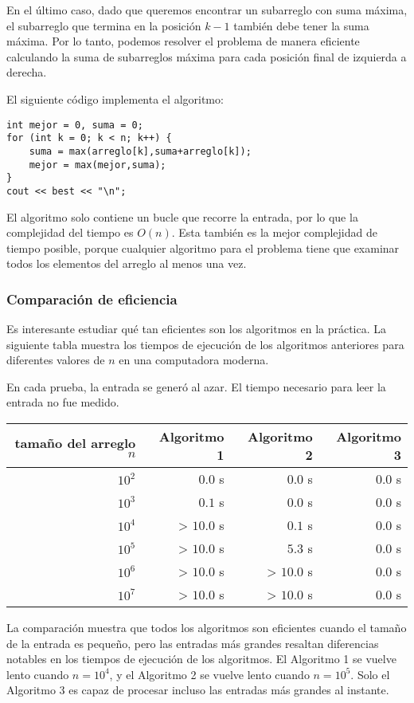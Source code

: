 En el último caso, dado que queremos
encontrar un subarreglo con suma máxima,
el subarreglo que termina en la posición $k-1$
también debe tener la suma máxima.
Por lo tanto, podemos resolver el problema de manera eficiente
calculando la suma de subarreglos máxima
para cada posición final de izquierda a derecha.

El siguiente código implementa el algoritmo:
\begin{lstlisting}
int mejor = 0, suma = 0;
for (int k = 0; k < n; k++) {
    suma = max(arreglo[k],suma+arreglo[k]);
    mejor = max(mejor,suma);
}
cout << best << "\n";
\end{lstlisting}

El algoritmo solo contiene un bucle
que recorre la entrada,
por lo que la complejidad del tiempo es $O(n)$.
Esta también es la mejor complejidad de tiempo posible,
porque cualquier algoritmo para el problema
tiene que examinar todos los elementos del arreglo al menos una vez.

\subsubsection{Comparación de eficiencia}

Es interesante estudiar qué tan eficientes
son los algoritmos en la práctica.
La siguiente tabla muestra los tiempos de ejecución
de los algoritmos anteriores para diferentes
valores de $n$ en una computadora moderna.

En cada prueba, la entrada se generó al azar.
El tiempo necesario para leer la entrada no fue
medido.

\begin{center}
\begin{tabular}{rrrr}
tamaño del arreglo $n$ & Algoritmo 1 & Algoritmo 2 & Algoritmo 3 \\
\hline
$10^2$ & $0.0$ s & $0.0$ s & $0.0$ s \\
$10^3$ & $0.1$ s & $0.0$ s & $0.0$ s \\
$10^4$ & > $10.0$ s & $0.1$ s & $0.0$ s \\
$10^5$ & > $10.0$ s & $5.3$ s & $0.0$ s \\
$10^6$ & > $10.0$ s & > $10.0$ s & $0.0$ s \\
$10^7$ & > $10.0$ s & > $10.0$ s & $0.0$ s \\
\end{tabular}
\end{center}

La comparación muestra que todos los algoritmos
son eficientes cuando el tamaño de la entrada es pequeño,
pero las entradas más grandes resaltan diferencias notables
en los tiempos de ejecución de los algoritmos.
El Algoritmo 1 se vuelve lento
cuando $n=10^4$, y el Algoritmo 2
se vuelve lento cuando $n=10^5$.
Solo el Algoritmo 3 es capaz de procesar
incluso las entradas más grandes al instante.
